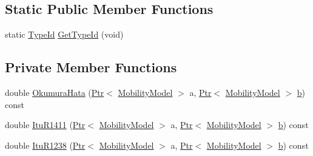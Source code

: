 \subsection*{Static Public Member Functions}
\begin{DoxyCompactItemize}
\item 
static \hyperlink{classns3_1_1TypeId}{Type\+Id} \hyperlink{classns3_1_1HybridBuildingsPropagationLossModel_a3e26c59932db0dd4d979fc57dd1721f1}{Get\+Type\+Id} (void)
\end{DoxyCompactItemize}
\subsection*{Private Member Functions}
\begin{DoxyCompactItemize}
\item 
double \hyperlink{classns3_1_1HybridBuildingsPropagationLossModel_a57a1faa19c936ea37cc795a2dcc66d2d}{Okumura\+Hata} (\hyperlink{classns3_1_1Ptr}{Ptr}$<$ \hyperlink{classns3_1_1MobilityModel}{Mobility\+Model} $>$ a, \hyperlink{classns3_1_1Ptr}{Ptr}$<$ \hyperlink{classns3_1_1MobilityModel}{Mobility\+Model} $>$ \hyperlink{lte__pathloss_8m_a21ad0bd836b90d08f4cf640b4c298e7c}{b}) const 
\item 
double \hyperlink{classns3_1_1HybridBuildingsPropagationLossModel_a96de0ed2ba5a5e579e2c20942ca568fa}{Itu\+R1411} (\hyperlink{classns3_1_1Ptr}{Ptr}$<$ \hyperlink{classns3_1_1MobilityModel}{Mobility\+Model} $>$ a, \hyperlink{classns3_1_1Ptr}{Ptr}$<$ \hyperlink{classns3_1_1MobilityModel}{Mobility\+Model} $>$ \hyperlink{lte__pathloss_8m_a21ad0bd836b90d08f4cf640b4c298e7c}{b}) const 
\item 
double \hyperlink{classns3_1_1HybridBuildingsPropagationLossModel_aa5d001f95f59c68b78765d1e8536f645}{Itu\+R1238} (\hyperlink{classns3_1_1Ptr}{Ptr}$<$ \hyperlink{classns3_1_1MobilityModel}{Mobility\+Model} $>$ a, \hyperlink{classns3_1_1Ptr}{Ptr}$<$ \hyperlink{classns3_1_1MobilityModel}{Mobility\+Model} $>$ \hyperlink{lte__pathloss_8m_a21ad0bd836b90d08f4cf640b4c298e7c}{b}) const 
\end{DoxyCompactItemize}
